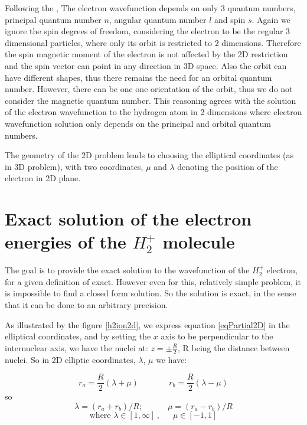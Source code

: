 Following the \cite{2DHAtom}, The electron wavefunction depends on only 3 quantum numbers, principal quantum number $ n $, angular quantum number $ l $ and spin $ s $. Again we ignore the spin degrees of freedom, considering the electron to be the regular 3 dimensional particles, where only its orbit is restricted to 2 dimensions.  Therefore the spin magnetic moment of the electron is not affected by the 2D restriction and the spin vector can point in any direction in 3D space. Also the orbit can have different shapes, thus there remains the need for an orbital quantum number. However, there can be one one orientation of the orbit, thus we do not consider the magnetic quantum number. This reasoning agrees with the solution of the electron wavefunction to the hydrogen atom in 2 dimensions \cite{H2atom} where electron wavefunction solution only depends on the principal and orbital quantum numbers.

The geometry of the 2D problem leads to choosing the elliptical coordinates (as in 3D problem), with two coordinates, $ \mu $ and $ \lambda $ denoting the position of the electron in 2D plane. \cite{Arfken}

\section{Exact solution of the electron energies of the \texorpdfstring{$ H_2^+ $}{$H_2^+$} molecule}

The goal is to provide the exact solution to the wavefunction of the $ H_2^{+} $ electron, for a given definition of exact. However even for this, relatively simple problem, it is impossible to find a closed form solution. So the solution is exact, in the sense that it can be done to an arbitrary precision.

As illustrated by the figure  \ref{h2ion2d}, we express equation \eqref{eqPartial2D} in the elliptical coordinates, and by setting the $ x $ axis to be perpendicular to the internuclear axis, we have the nuclei at: $ z = \pm \frac{R}{2}  $, R being the distance between nuclei. So in  2D elliptic coordinates, $ \lambda $, $ \mu $ we have:

\begin{equation}\label{variables1}
r_a = \frac{R}{2}\left(\lambda + \mu \right)\,\,\,\,\,\,\,\,\,\,\,\,\,\,\,\,\,\,\,\,\,\, r_b = \frac{R}{2}\left(\lambda - \mu \right)
\end{equation}
so
\begin{equation}\label{variables1a}
\lambda = \left(r_a + r_b\right)/R;\,\,\,\,\,\,\,\,\,\,\,\,\,\,\,\,\,\,\mu =  \left(r_a - r_b\right)/R
\end{equation}
\begin{equation}
\text{where } \lambda \in \left[1,\infty\right]\,,\,\,\,\,\,\,\,\,\,\mu \in \left[ -1, 1 \right]
\end{equation}


